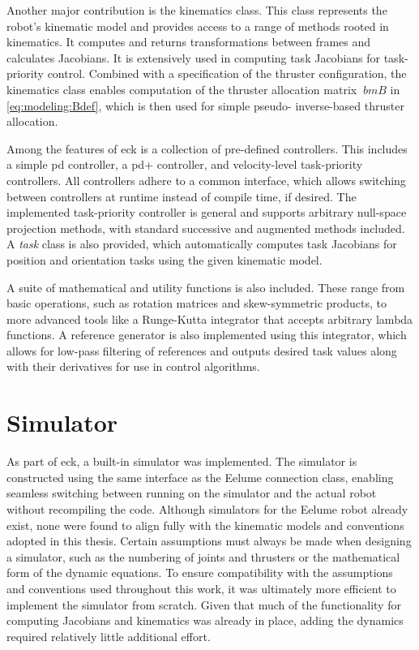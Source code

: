 Another major contribution is the kinematics class. This class represents the 
robot’s kinematic model and provides access to a range of methods rooted in 
kinematics. It computes and returns transformations between frames and calculates 
Jacobians. It is extensively used in computing task Jacobians for task-
priority control. Combined with a specification of the thruster configuration, 
the kinematics class enables computation of the thruster allocation matrix \(\
bm{B}\) in \autoref{eq:modeling:Bdef}, which is then used for simple pseudo-
inverse-based thruster allocation.

Among the features of \gls{eck} is a collection of pre-defined controllers. 
This includes a simple \gls{pd} controller, a \gls{pd+} controller, and 
velocity-level task-priority controllers. All controllers adhere to a common 
interface, which allows switching between controllers at runtime instead of 
compile time, if desired. The implemented task-priority controller is general 
and supports arbitrary null-space projection methods, with standard successive 
and augmented methods included. A \textit{task} class is also provided, which 
automatically computes task Jacobians for position and orientation tasks using 
the given kinematic model.

A suite of mathematical and utility functions is also included. These range 
from basic operations, such as rotation matrices and skew-symmetric products, 
to more advanced tools like a Runge-Kutta integrator that accepts arbitrary 
lambda functions. A reference generator is also implemented using this 
integrator, which allows for low-pass filtering of references and outputs 
desired task values along with their derivatives for use in control algorithms.

\section{Simulator}

As part of \gls{eck}, a built-in simulator was implemented. The simulator is 
constructed using the same interface as the Eelume connection class, enabling 
seamless switching between running on the simulator and the actual robot 
without recompiling the code. Although simulators for the Eelume robot already 
exist, none were found to align fully with the kinematic models and 
conventions adopted in this thesis. Certain assumptions must always be made 
when designing a simulator, such as the numbering of joints and thrusters or 
the mathematical form of the dynamic equations. To ensure compatibility with 
the assumptions and conventions used throughout this work, it was ultimately 
more efficient to implement the simulator from scratch. Given that much of the 
functionality for computing Jacobians and kinematics was already in place, 
adding the dynamics required relatively little additional effort.

